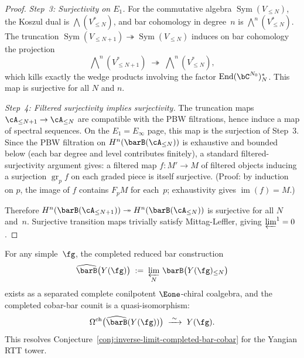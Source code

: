 \begin{proof}
\emph{Step~3: Surjectivity on $E_1$.}
For the commutative algebra $\operatorname{Sym}(V_{\leq N})$,
the Koszul dual is $\bigwedge(V_{\leq N}^*)$, and bar cohomology
in degree~$n$ is $\bigwedge^n(V_{\leq N}^*)$.  The truncation
$\operatorname{Sym}(V_{\leq N+1}) \twoheadrightarrow
\operatorname{Sym}(V_{\leq N})$ induces on bar cohomology the
projection
\[
\textstyle
\bigwedge\nolimits^n(V_{\leq N+1}^*)
\;\twoheadrightarrow\;
\bigwedge\nolimits^n(V_{\leq N}^*),
\]
which kills exactly the wedge products involving the factor
$\operatorname{End}(\bC^{N_0})_N^*$.  This map is surjective
for all $N$ and $n$.

\emph{Step~4: Filtered surjectivity implies surjectivity.}
The truncation maps $\cA_{\leq N+1} \to \cA_{\leq N}$ are
compatible with the PBW filtrations, hence induce a map of
spectral sequences.  On the $E_1 = E_\infty$ page, this map
is the surjection of Step~3.  Since the PBW filtration on
$H^n(\barB(\cA_{\leq N}))$ is exhaustive and bounded below
(each bar degree and level contributes finitely), a standard
filtered-surjectivity argument gives: a filtered map
$f\colon M' \to M$ of filtered objects inducing a surjection
$\operatorname{gr}_p f$ on each graded piece is itself
surjective.  (Proof: by induction on $p$, the image of
$f$ contains $F_p M$ for each~$p$; exhaustivity gives
$\operatorname{im}(f) = M$.)

Therefore $H^n(\barB(\cA_{\leq N+1}))
\twoheadrightarrow H^n(\barB(\cA_{\leq N}))$
is surjective for all $N$ and~$n$.  Surjective transition maps
trivially satisfy Mittag-Leffler, giving
$\varprojlim^1 = 0$.
\end{proof}

\begin{corollary}
\label{cor:completed-bar-cobar-yangian}
For any simple~$\fg$, the completed reduced bar construction
\[
\widehat{\barB}\bigl(Y(\fg)\bigr)
\;:=\;
\varprojlim_N\, \barB\bigl(Y(\fg)_{\leq N}\bigr)
\]
exists as a separated complete conilpotent $\Eone$-chiral coalgebra,
and the completed cobar-bar counit is a quasi-isomorphism:
\[
\Omega^{\mathrm{ch}}\bigl(
  \widehat{\barB}(Y(\fg))
\bigr)
\;\xrightarrow{\;\sim\;}\;
Y(\fg).
\]
This resolves
Conjecture~\textup{\ref{conj:inverse-limit-completed-bar-cobar}}
for the Yangian RTT tower.
\end{corollary}

